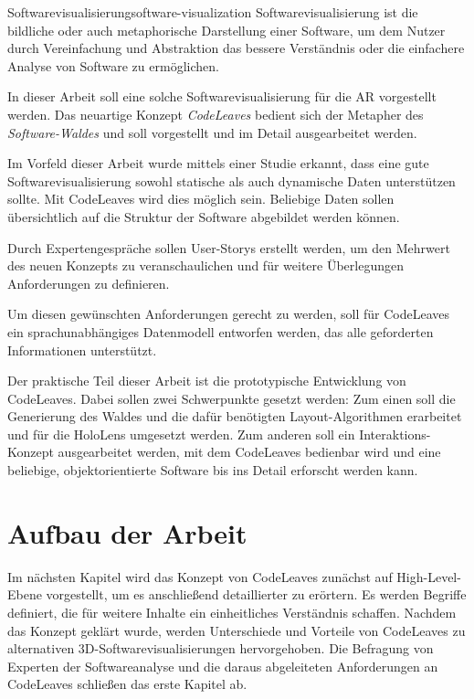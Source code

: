 \begin{defbox}{Softwarevisualisierung}{software-visualization}
Softwarevisualisierung ist die bildliche oder auch metaphorische Darstellung einer Software, um dem Nutzer durch Vereinfachung und Abstraktion das bessere Verständnis oder die einfachere Analyse von Software zu ermöglichen.
\end{defbox}

In dieser Arbeit soll eine solche Softwarevisualisierung für die AR vorgestellt werden. Das neuartige Konzept \emph{CodeLeaves} bedient sich der Metapher des \textit{Software-Waldes} und soll vorgestellt und im Detail ausgearbeitet werden.

Im Vorfeld dieser Arbeit wurde mittels einer Studie erkannt, dass eine gute Softwarevisualisierung sowohl statische als auch dynamische Daten unterstützen sollte. Mit CodeLeaves wird dies möglich sein. Beliebige Daten sollen übersichtlich auf die Struktur der Software abgebildet werden können.

Durch Expertengespräche sollen User-Storys erstellt werden, um den Mehrwert des neuen Konzepts zu veranschaulichen und für weitere Überlegungen Anforderungen zu definieren.

Um diesen gewünschten Anforderungen gerecht zu werden, soll für CodeLeaves ein sprachunabhängiges Datenmodell entworfen werden, das alle geforderten Informationen unterstützt.

Der praktische Teil dieser Arbeit ist die prototypische Entwicklung von CodeLeaves. Dabei sollen zwei Schwerpunkte gesetzt werden: Zum einen soll die Generierung des Waldes und die dafür benötigten Layout-Algorithmen erarbeitet und für die HoloLens umgesetzt werden. Zum anderen soll ein Interaktions-Konzept ausgearbeitet werden, mit dem CodeLeaves bedienbar wird und eine beliebige, objektorientierte Software bis ins Detail erforscht werden kann.

\section{Aufbau der Arbeit}
Im nächsten Kapitel wird das Konzept von CodeLeaves zunächst auf High-Level-Ebene vorgestellt, um es anschließend detaillierter zu erörtern. Es werden Begriffe definiert, die für weitere Inhalte ein einheitliches Verständnis schaffen. Nachdem das Konzept geklärt wurde, werden Unterschiede und Vorteile von CodeLeaves zu alternativen 3D-Softwarevisualisierungen hervorgehoben. Die Befragung von Experten der Softwareanalyse und die daraus abgeleiteten Anforderungen an CodeLeaves schließen das erste Kapitel ab.

